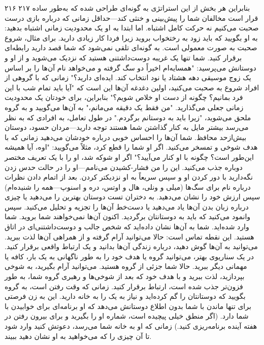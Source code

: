 ۲۱۶ ۲۱۷  
بنابراین هر بخش از این استراتژی به گونه‌ای طراحی شده که به‌طور ساده قرار است مخالفان شما را پیش‌بینی و خنثی کند—حداقل زمانی که درباره بازی درست صحبت می‌کنیم نه حرکت کامل اشتباه. اما ابتدا به او یک محدودیت زمانی اشتباه بدهید: به او بگویید که باید زود به رختخواب بروید زیرا فردا کار زیادی دارید.  
برای مثال، شروع صحبت به صورت معمولی است. به گونه‌ای تلقی نمی‌شود که شما قصد دارید رابطه‌ای برقرار کنید. شما تنها یک غریبه دوست‌داشتنی هستید که نزدیک می‌شوید و از او و دوستانش می‌پرسید: "همسایه‌ام اخیراً دو سگ گرفته و می‌خواهد نام آن‌ها را بر اساس یک زوج موسیقی دهه هشتاد یا نود انتخاب کند. ایده‌ای دارید؟"  
زمانی که با گروهی از افراد شروع به صحبت می‌کنید، اولین دغدغه آن‌ها این است که "آیا باید تمام شب با این فرد بمانیم؟ چگونه از دست او خلاص شویم؟" بنابراین، برای خودتان یک محدودیت زمانی جعلی می‌گذارید. "من فقط یک دقیقه می‌مانم،" به آن‌ها می‌گویید و به گروه ملحق می‌شوید، "زیرا باید به دوستانم برگردم."  
در طول تعامل، به افرادی که به نظر می‌رسد بیشتر مایل به کنار گذاشتن شما هستند توجه دارید—مردان حسود، دوستان بیش‌از‌حد محافظ. شما آن‌ها را احساس خوبی درباره خودشان می‌دهید زمانی که با هدف شوخی و تمسخر می‌کنید. اگر او شما را قطع کرد، مثلاً می‌گویید: "اوه، آیا همیشه این‌طور است؟ چگونه با او کنار می‌آیید؟" اگر او شوکه شد، او را با یک تعریف مختصر دوباره جذب می‌کنید. این را من فشار-کشیدن می‌نامم—او را در حالت حدس زدن نگه‌دارید با دور کردن او و سپس سریعاً به او نزدیکتر کردن.  
بعد از اتمام دادن نظرات درباره نام برای سگ‌ها (میلی و ونلی، هال و اوتس، دره و اسنوپ—همه را شنیده‌ام) سپس ارزش خود را نشان می‌دهید. به دختران تست دوستان بهترین را می‌دهید یا چیزی درباره زبان بدن آن‌ها یاد می‌دهید یا دست‌خط آن‌ها را تجزیه و تحلیل می‌کنید. سپس وانمود می‌کنید که باید به دوستانتان برگردید. اکنون آن‌ها نمی‌خواهند شما بروید. شما وارد شده‌اید. شما به آن‌ها نشان داده‌اید که شخص جالب و دوست‌داشتنی‌ای در اتاق هستید. این نقطه تماس است: حالا می‌توانید آرام گرفته و از همراهی آن‌ها لذت ببرید. می‌توانید به آن‌ها گوش دهید، درباره زندگی آن‌ها بدانید و یک ارتباط واقعی برقرار کنید.  
در یک سناریوی بهتر، می‌توانید گروه یا هدف خود را به طور ناگهانی به یک بار، کافه یا مهمانی دیگر ببرید. حالا شما جزئی از گروه هستید. می‌توانید آرام بگیرید، به شوخی بپردازید، لذت ببرید و با هدف خود که بعد از شوخی‌ها و رهبری گروه شما، به طور فزون‌تر جذب شده است، ارتباط برقرار کنید. زمانی که وقت رفتن است، به گروه بگویید که دوستانتان را گم کرده‌اید و نیاز به یک را به خانه دارید. این به زن فرصتی برای تنها ماندن با شما بدون اطلاع دوستانش می‌دهد که او برنامه‌ای برای خوابیدن با شما دارد. (اگر منطق خیلی پیچیده است، شماره او را بگیرید و برای بیرون رفتن در هفته آینده برنامه‌ریزی کنید.)  
زمانی که او به خانه شما می‌رسد، دعوتش کنید وارد شود تا آن چیزی را که می‌خواهید به او نشان دهید ببیند.